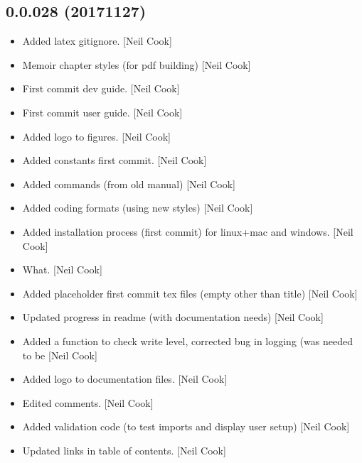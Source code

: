 \documentclass[a4paper,10pt,english]{report}
\begin{document}
\subsection{0.0.028 (2017\sphinxhyphen{}11\sphinxhyphen{}27)}
\label{\detokenize{misc/changelog:id543}}\begin{itemize}
\item {} 
Added latex gitignore. {[}Neil Cook{]}

\item {} 
Memoir chapter styles (for pdf building) {[}Neil Cook{]}

\item {} 
First commit dev guide. {[}Neil Cook{]}

\item {} 
First commit user guide. {[}Neil Cook{]}

\item {} 
Added logo to figures. {[}Neil Cook{]}

\item {} 
Added constants first commit. {[}Neil Cook{]}

\item {} 
Added commands (from old manual) {[}Neil Cook{]}

\item {} 
Added coding formats (using new styles) {[}Neil Cook{]}

\item {} 
Added installation process (first commit) for linux+mac and windows.
{[}Neil Cook{]}

\item {} 
What. {[}Neil Cook{]}

\item {} 
Added placeholder first commit tex files (empty other than title)
{[}Neil Cook{]}

\item {} 
Updated progress in readme (with documentation needs) {[}Neil Cook{]}

\item {} 
Added a function to check write level, corrected bug in logging (was
 needed to be  {[}Neil Cook{]}

\item {} 
Added logo to documentation files. {[}Neil Cook{]}

\item {} 
Edited comments. {[}Neil Cook{]}

\item {} 
Added validation code (to test imports and display user setup) {[}Neil
Cook{]}

\item {} 
Updated links in table of contents. {[}Neil Cook{]}

\end{itemize}
\end{document}
